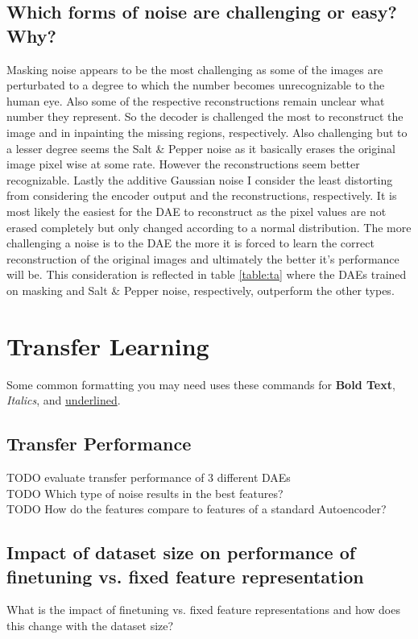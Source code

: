 \documentclass[10pt, a4paper]{article}
\begin{document}
    \subsection{Which forms of noise are challenging or easy? Why?}
    Masking noise appears to be the most challenging as some of the images are perturbated to a degree to which the number becomes unrecognizable to the human eye. Also some of the respective reconstructions remain unclear what number they represent. So the decoder is challenged the most to reconstruct the image and in inpainting the missing regions, respectively.\newline
    Also challenging but to a lesser degree seems the Salt \& Pepper noise as it basically erases the original image pixel wise at some rate. However the reconstructions seem better recognizable. Lastly the additive Gaussian noise I consider the least distorting from considering the encoder output and the reconstructions, respectively. It is most likely the easiest for the DAE to reconstruct as the pixel values are not erased completely but only changed according to a normal distribution.\newline
    The more challenging a noise is to the DAE the more it is forced to learn the correct reconstruction of the original images and ultimately the better it's performance will be. This consideration is reflected in table \ref{table:ta} where the DAEs trained on masking and Salt \& Pepper noise, respectively, outperform the other types.
    
	
	\section{Transfer Learning}
	Some common formatting you may need uses these commands for \textbf{Bold Text}, \textit{Italics}, and \underline{underlined}.
	
	\subsection{Transfer Performance}
    TODO evaluate transfer performance of 3 different DAEs\\
    TODO Which type of noise results in the best features?\\
    TODO How do the features compare to features of a standard Autoencoder?
    
    \subsection{Impact of dataset size on performance of finetuning vs. fixed feature representation}
    What is the impact of finetuning vs. fixed feature representations and how does this change with the dataset size?
	
\end{document}

